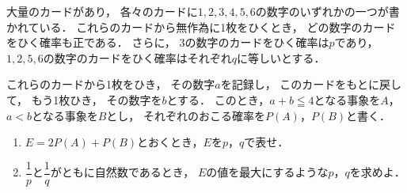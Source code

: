 \documentclass[../../main.tex]{subfiles}
\begin{document}
大量のカードがあり，
各々のカードに$1,2,3,4,5,6$の数字のいずれかの一つが書かれている．
これらのカードから無作為に1枚をひくとき，
どの数字のカードをひく確率も正である．
さらに，
3の数字のカードをひく確率は$p$であり，
$1,2,5,6$の数字のカードをひく確率はそれぞれ$q$に等しいとする．

これらのカードから1枚をひき，
その数字$a$を記録し，
このカードをもとに戻して，
もう1枚ひき，
その数字を$b$とする．
このとき，$a+b\leqq4$となる事象を$A$，$a<b$となる事象を$B$とし，
それぞれのおこる確率を$P(A)$，$P(B)$と書く．
\begin{enumerate}
  \item $E=2P(A)+P(B)$とおくとき，$E$を$p$，$q$で表せ．
  \item $\displaystyle\dfrac{1}{p}$と$\displaystyle\dfrac{1}{q}$がともに自然数であるとき，
    $E$の値を最大にするような$p$，$q$を求めよ．
\end{enumerate}
\end{document}
